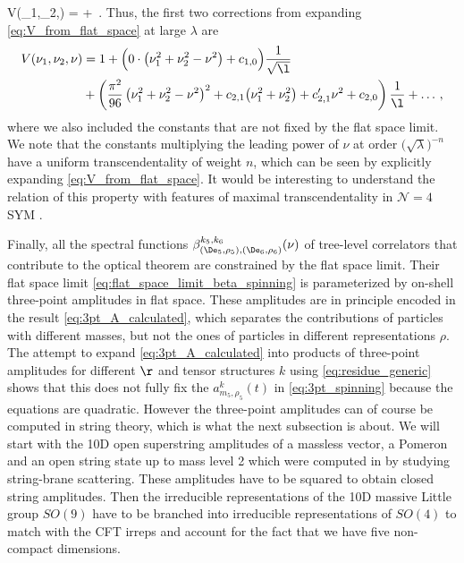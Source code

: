 \beq
V(\nu_1,\nu_2,\nu) = 
+ \,.
\label{eq:V_from_flat_space}
\eeq
Thus, the first two corrections from expanding \eqref{eq:V_from_flat_space} at large $\lambda$ are
\begin{align}
	V(\nu_1,\nu_2,\nu) & = 1+\Big(0\cdot\big( \nu_1^2+\nu_2^2-\nu^2 \big) + c_{1,0}\Big) \frac{1}{\sqrt{\l}}
	\label{eq:V_polynomial}                                                                                                                                                                 \\
	                   & +\left( \frac{\pi^2}{96} \left( \nu_1^2+\nu_2^2-\nu^2 \right)^2 +c_{2,1} \big(\nu_1^2  + \nu_2^2\big)  + c'_{2,1} \nu^2 + c_{2,0} \right) \frac{1}{\l} + \ldots\,,
	\nonumber
\end{align}
where we also included the constants  that are not fixed by the flat space limit. We note that the constants multiplying the leading power of $\nu$ at order $\big(\sqrt{\lambda}\big)^{-n}$ have a uniform transcendentality of weight $n$, which can be seen by explicitly expanding \eqref{eq:V_from_flat_space}. It would be interesting to understand the relation of this property with features of maximal transcendentality in $\mathcal{N}=4$ SYM \cite{Kotikov:2002ab,Kotikov:2007cy}.


Finally, all the spectral functions $\beta^{k_5,k_6}_{(\De_5,\rho_5),(\De_6,\rho_6)} (\nu)$ of tree-level correlators that contribute to the optical theorem are constrained
by the flat space limit. Their flat space limit \eqref{eq:flat_space_limit_beta_spinning} is parameterized by on-shell three-point amplitudes in flat space.
These amplitudes are in principle encoded in the result \eqref{eq:3pt_A_calculated},
which separates the contributions of particles with different masses, but not the ones of particles in different representations $\rho$.
The attempt to expand \eqref{eq:3pt_A_calculated} into products of three-point amplitudes for different $\r$ and tensor structures $k$ using \eqref{eq:residue_generic} shows that this does not fully fix the $a_{m_5,\rho_5}^{k}(t)$ in \eqref{eq:3pt_spinning} because the equations are quadratic.
However the three-point amplitudes can of course be computed in string theory, which is what the next subsection is about.
We will start with the 10D open superstring amplitudes of a massless vector, a Pomeron and an open string state up to mass level 2 which were computed in \cite{DAppollonio:2013mgj} by studying string-brane scattering. These amplitudes have to be squared to obtain closed string amplitudes. Then the irreducible representations of the 10D massive Little group $SO(9)$ have to be branched into irreducible representations of $SO(4)$ to match with the CFT irreps and account for the fact that we have five non-compact dimensions.




